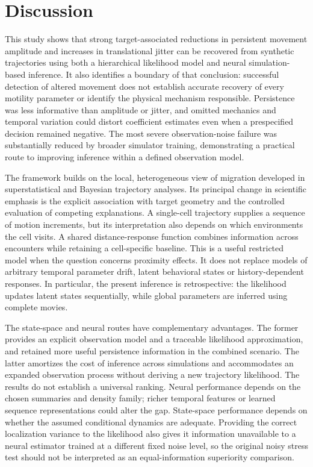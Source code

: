 \documentclass[12pt]{article}
\begin{document}
\section*{Discussion}
This study shows that strong target-associated reductions in persistent movement amplitude and increases in translational jitter can be recovered from synthetic trajectories using both a hierarchical likelihood model and neural simulation-based inference. It also identifies a boundary of that conclusion: successful detection of altered movement does not establish accurate recovery of every motility parameter or identify the physical mechanism responsible. Persistence was less informative than amplitude or jitter, and omitted mechanics and temporal variation could distort coefficient estimates even when a prespecified decision remained negative. The most severe observation-noise failure was substantially reduced by broader simulator training, demonstrating a practical route to improving inference within a defined observation model.

The framework builds on the local, heterogeneous view of migration developed in superstatistical and Bayesian trajectory analyses\citep{metzner2015,mark2018}. Its principal change in scientific emphasis is the explicit association with target geometry and the controlled evaluation of competing explanations. A single-cell trajectory supplies a sequence of motion increments, but its interpretation also depends on which environments the cell visits. A shared distance-response function combines information across encounters while retaining a cell-specific baseline. This is a useful restricted model when the question concerns proximity effects. It does not replace models of arbitrary temporal parameter drift, latent behavioral states or history-dependent responses. In particular, the present inference is retrospective: the likelihood updates latent states sequentially, while global parameters are inferred using complete movies.

The state-space and neural routes have complementary advantages. The former provides an explicit observation model and a traceable likelihood approximation, and retained more useful persistence information in the combined scenario. The latter amortizes the cost of inference across simulations and accommodates an expanded observation process without deriving a new trajectory likelihood. The results do not establish a universal ranking. Neural performance depends on the chosen summaries and density family; richer temporal features or learned sequence representations could alter the gap. State-space performance depends on whether the assumed conditional dynamics are adequate. Providing the correct localization variance to the likelihood also gives it information unavailable to a neural estimator trained at a different fixed noise level, so the original noisy stress test should not be interpreted as an equal-information superiority comparison.
\end{document}
